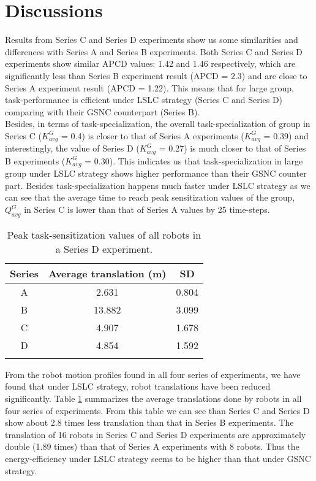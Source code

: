 \section{Discussions}
\label{local-comm:discuss}
Results from Series C and Series D experiments show us some similarities and differences with Series A and Series B experiments. Both Series C and Series D experiments show similar APCD values: 1.42 and 1.46 respectively, which are significantly less than Series B experiment result (APCD = 2.3) and are close to Series A experiment result (APCD = 1.22). This means that for large group, task-performance  is efficient under LSLC strategy (Series C and Series D) comparing with their GSNC counterpart (Series B). \\
Besides, in terms of task-specialization, the overall task-specialization of group in Series C ($K^G_{avg}$ = 0.4) is  closer to that of Series A experiments ($K^G_{avg}$ = 0.39) and interestingly, the value of  Series D ($K^G_{avg}$ = 0.27) is  much closer to that of Series B experiments ($K^G_{avg}$ = 0.30). This indicates us that task-specialization in large group under LSLC strategy shows higher performance than their GSNC counter part. Besides task-specialization happens much faster under LSLC strategy as we can see that the average time to reach peak sensitization values  of the group,  $Q^G_{avg}$ in Series C is lower than that of Series A values by 25 time-steps.\\ 
\begin{table}
\begin{center}
\caption{Peak task-sensitization values of all robots in a Series D experiment.}
\begin{tabular}{|c|c|c|}
\hline \textbf{Series} & \textbf{Average translation (m)} & \textbf{SD} \\ 
\hline A & 2.631 & 0.804 \\ 
\hline B & 13.882 & 3.099 \\
\hline C & 4.907 & 1.678 \\
\hline D & 4.854 & 1.592 \\
\hline
\label{table:motion-cmp} 
\end{tabular}
\end{center}
\end{table}
From the robot motion profiles found in all four series of experiments, we have found that under LSLC strategy, robot translations have been reduced significantly. Table \ref{table:motion-cmp} summarizes the average translations done by robots in all four series of experiments. From this table we can see than Series C and Series D show about 2.8 times less translation than that in Series B experiments. The translation of 16 robots in Series C and Series D experiments are approximately double (1.89 times) than that of Series A experiments with 8 robots.  Thus the energy-efficiency under LSLC strategy seems to be higher  than that under GSNC strategy.\\
